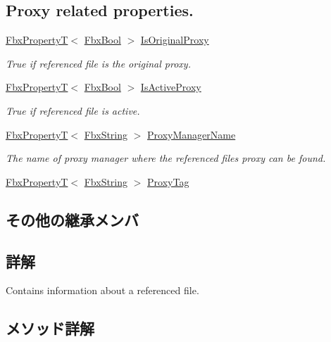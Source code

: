 \subsection*{Proxy related properties.}
\begin{DoxyCompactItemize}
\item 
\hyperlink{class_fbx_property_t}{Fbx\+PropertyT}$<$ \hyperlink{fbxtypes_8h_a92e0562b2fe33e76a242f498b362262e}{Fbx\+Bool} $>$ \hyperlink{class_fbx_scene_reference_a5bf9c05304a408f9436a0677c3b4acef}{Is\+Original\+Proxy}
\begin{DoxyCompactList}\small\item\em {\ttfamily True} if referenced file is the original proxy. \end{DoxyCompactList}\item 
\hyperlink{class_fbx_property_t}{Fbx\+PropertyT}$<$ \hyperlink{fbxtypes_8h_a92e0562b2fe33e76a242f498b362262e}{Fbx\+Bool} $>$ \hyperlink{class_fbx_scene_reference_aab3571ac4fd553d5f3fbb3710c39adac}{Is\+Active\+Proxy}
\begin{DoxyCompactList}\small\item\em {\ttfamily True} if referenced file is active. \end{DoxyCompactList}\item 
\hyperlink{class_fbx_property_t}{Fbx\+PropertyT}$<$ \hyperlink{class_fbx_string}{Fbx\+String} $>$ \hyperlink{class_fbx_scene_reference_aac92c29ead8f25eea0dbaf0649b49c96}{Proxy\+Manager\+Name}
\begin{DoxyCompactList}\small\item\em The name of proxy manager where the referenced file\textquotesingle{}s proxy can be found. \end{DoxyCompactList}\item 
\hyperlink{class_fbx_property_t}{Fbx\+PropertyT}$<$ \hyperlink{class_fbx_string}{Fbx\+String} $>$ \hyperlink{class_fbx_scene_reference_a0ced8e6b90ec7d085b82c194188d89bb}{Proxy\+Tag}
\end{DoxyCompactItemize}
\subsection*{その他の継承メンバ}


\subsection{詳解}
Contains information about a referenced file. 

\subsection{メソッド詳解}
\mbox{\label{class_fbx_scene_reference_a93aabe2339dc932673dacb8be72eb813}} 

